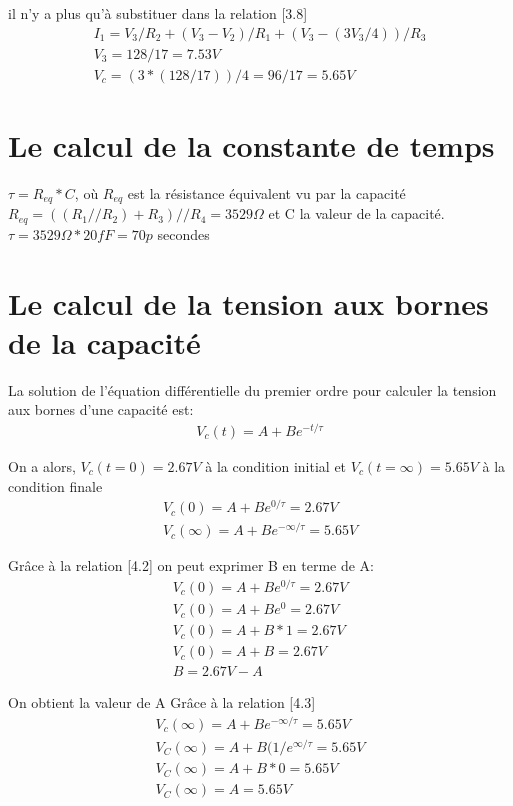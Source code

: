 \documentclass{homeworg}
\begin{document}
    il n’y a plus qu’à substituer dans la relation [3.8]
    \begin{align}
        I_1 = V_3 / R_2 + (V_3 - V_2) / R_1 + (V_3 - (3V_3 / 4)) / R_3\\
        V_3 = 128/17 = 7.53V\\
        V_c = (3 * (128 / 17)) / 4 = 96/17 = 5.65V
    \end{align}

\newpage
\section{Le calcul de la constante de temps}
$\tau = R_{eq} * C$, où $R_{eq}$ est la résistance équivalent vu par la capacité $R_{eq} = ((R_1 // R_2) + R_3) // R_4 = 3529\Omega$ et C la valeur de la capacité. $\tau = 3529\Omega * 20fF = 70p$ secondes

\section{Le calcul de la tension aux bornes de la capacité}
La solution de l'équation différentielle du premier ordre pour calculer la tension aux bornes d'une capacité est:
\begin{align}
     V_c(t) = A + B e^{-t / \tau}
\end{align}

On a alors, $V_c(t=0) = 2.67V$ à la condition initial et $V_c(t=\infty)= 5.65V$ à la condition finale
\begin{align}
    V_c(0) = A + B e^{0/ \tau} = 2.67V\\
    V_c(\infty) = A + B e^{-\infty/ \tau} = 5.65V
\end{align}

Grâce à la relation [4.2] on peut exprimer B en terme de A:
\begin{align}
    V_c(0) = A + B e^{0/ \tau} = 2.67V\\
    V_c(0) = A + B e^{0} = 2.67V\\
    V_c(0) = A + B * 1 = 2.67V\\
    V_c(0) = A + B = 2.67V\\
    B = 2.67V - A
\end{align}

On obtient la valeur de A Grâce à la relation [4.3]
\begin{align}
    V_c(\infty) = A + B e^{-\infty/ \tau} = 5.65V\\
    V_C(\infty) = A + B (1 / e^{\infty/ \tau} = 5.65V\\
    V_C(\infty) = A + B * 0 = 5.65V\\
    V_C(\infty) = A = 5.65V
\end{align}
\end{document}
